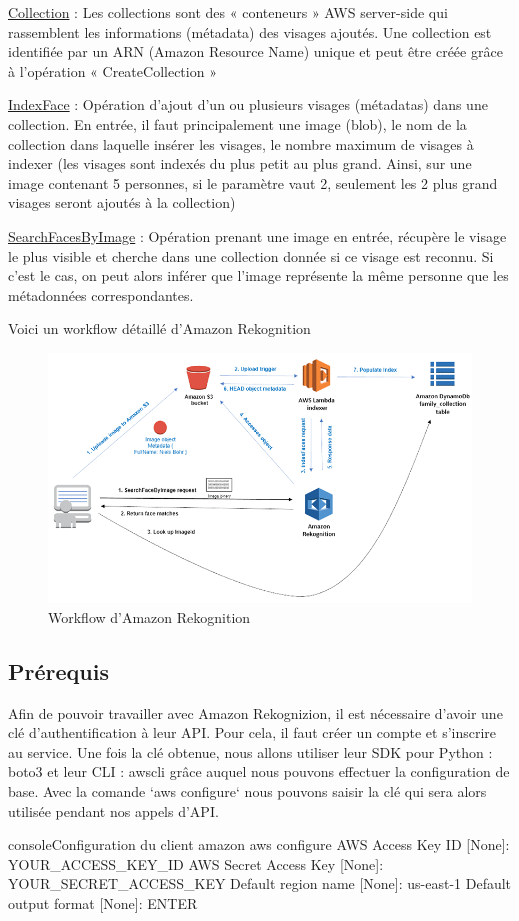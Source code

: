 \underline{Collection} : Les collections sont des « conteneurs » AWS server-side qui rassemblent les informations (métadata)
des visages ajoutés. Une collection est identifiée par un ARN (Amazon Resource Name) unique et peut être créée
grâce à l’opération « CreateCollection »

\underline{IndexFace} : Opération d’ajout d’un ou plusieurs visages (métadatas) dans une collection. En entrée, il faut
principalement une image (blob), le nom de la collection dans laquelle insérer les visages, le nombre maximum de
visages à indexer (les visages sont indexés du plus petit au plus grand. Ainsi, sur une image contenant 5 personnes,
si le paramètre vaut 2, seulement les 2 plus grand visages seront ajoutés à la collection)

\underline{SearchFacesByImage} : Opération prenant une image en entrée, récupère le visage le plus visible et cherche dans
une collection donnée si ce visage est reconnu. Si c’est le cas, on peut alors inférer que l’image représente la même
personne que les métadonnées correspondantes.

Voici un workflow détaillé d’Amazon Rekognition

\begin{figure}[H]
	\centering
	\includegraphics[width=12cm]{images/proto-6.png}
	\caption{Workflow d'Amazon Rekognition}
	\label{fig:reko-workflow}
\end{figure}

\subsection{Prérequis}

Afin de pouvoir travailler avec Amazon Rekognizion, il est nécessaire d’avoir une clé d’authentification à leur API.
Pour cela, il faut créer un compte et s’inscrire au service. Une fois la clé obtenue, nous allons utiliser leur SDK pour
Python : boto3  et leur CLI : awscli grâce auquel nous pouvons effectuer la configuration de base.
Avec la comande `aws configure` nous pouvons saisir la clé qui sera alors utilisée pendant nos appels d’API.

\begin{listingsbox}{console}{Configuration du client amazon}
aws configure
AWS Access Key ID [None]:  YOUR_ACCESS_KEY_ID
AWS Secret Access Key [None]: YOUR_SECRET_ACCESS_KEY
Default region name [None]: us-east-1
Default output format [None]: ENTER
\end{listingsbox}